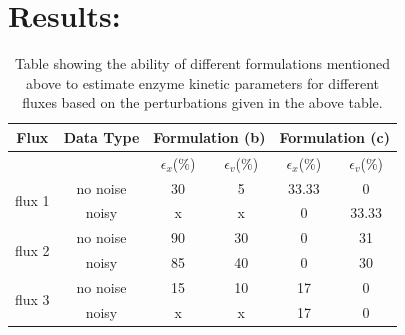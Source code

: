 \documentclass[10pt]{report}
\begin{document}
	\section{Results:}

	\begin{table}[!tbhp]
		\caption{Table showing the ability of different formulations mentioned above to estimate enzyme kinetic parameters for different fluxes based on the perturbations given in the above table.}
		\begin{center}				
			\begin{tabular}{cccccc}
				\hline
				Flux & Data Type & \multicolumn{2}{c}{Formulation (b)} & \multicolumn{2}{c}{Formulation (c)}\\
				\hline
				&&$\epsilon_x$(\%)&$\epsilon_v$(\%)&$\epsilon_x$(\%)&$\epsilon_v$(\%)\\
				\hline
				\multirow{2}{*}{flux 1} & no noise & 30 & 5 & 33.33 & 0\\
												  &	noisy & x & x & 0 & 33.33\\
			  	\hline
				 \multirow{2}{*}{flux 2} & no noise & 90 & 30 & 0 & 31\\
				 									& noisy & 85 & 40 & 0 & 30\\
				\hline				 									
				\multirow{2}{*}{flux 3} & no noise & 15 & 10 & 17 & 0\\
													& noisy & x & x & 17 & 0\\
				\hline			
			\end{tabular}
		\end{center}	
		\label{tab:res1}
	\end{table}
\end{document}
